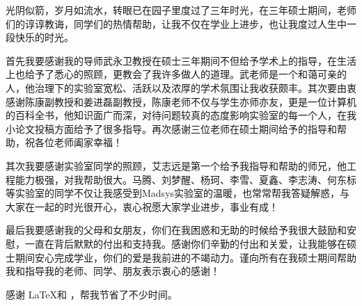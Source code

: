 \begin{acknowledgement}
	光阴似箭，岁月如流水，转眼已在园子里度过了三年时光，在三年硕士期间，老师们的谆谆教诲，同学们的热情帮助，让我不仅在学业上进步，也让我度过人生中一段快乐的时光。
	
	首先我要感谢我的导师武永卫教授在硕士三年期间不但给予学术上的指导，在生活上也给予了悉心的照顾，更教会了我许多做人的道理。武老师是一个和蔼可亲的人，他治理下的实验室宽松、活跃以及浓厚的学术氛围让我收获颇丰。其次要由衷感谢陈康副教授和姜进磊副教授，陈康老师不仅与学生亦师亦友，更是一位计算机的百科全书，他知识面广而深，对待问题较真的态度影响实验室的每一个人，在我小论文投稿方面给予了很多指导。再次感谢三位老师在硕士期间给予的指导和帮助，祝各位老师阖家幸福！
	
	其次我要感谢实验室同学的照顾，艾志远是第一个给予我指导和帮助的师兄，他工程能力极强，对我帮助很大。马腾、刘梦醒、杨珂、李雪、夏鑫、李志涛、何东标等实验室的同学不仅让我感受到Madsys实验室的温暖，也常常帮我答疑解惑，与大家在一起的时光很开心，衷心祝愿大家学业进步，事业有成！
	
	最后我要感谢我的父母和女朋友，你们在我困惑和无助的时候给予我很大鼓励和安慰，一直在背后默默的付出和支持我。感谢你们辛勤的付出和关爱，让我能够在硕士期间安心完成学业，你们的爱是我前进的不竭动力。谨向所有在我硕士期间帮助我和指导我的老师、同学、朋友表示衷心的感谢！
	
	 感谢 \LaTeX 和 \thuthesis\cite{thuthesis}，帮我节省了不少时间。
\end{acknowledgement}
